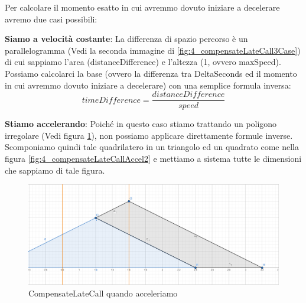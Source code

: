 \documentclass[main.tex]{subfiles}
\begin{document}
Per calcolare il momento esatto in cui avremmo dovuto iniziare a decelerare avremo due casi possibili: 
\begin{itemize}
    \item \textbf{Siamo a velocità costante}: La differenza di spazio percorso è un parallelogramma (Vedi la seconda immagine di \ref{fig:4_compensateLateCall3Case}) di cui sappiamo l'area (distanceDifference) e l'altezza (1, ovvero maxSpeed). Possiamo calcolarci la base (ovvero la differenza tra DeltaSeconds ed il momento in cui avremmo dovuto iniziare a decelerare) con una semplice formula inversa:
    \[timeDifference = \frac{distanceDifference}{speed}\]
    
    \begin{minipage}{.45\textwidth}
        \item \textbf{Stiamo accelerando}: Poiché in questo caso stiamo trattando un poligono irregolare (Vedi figura \ref{fig:4_compensateLateCallAccel1}), non possiamo applicare direttamente formule inverse. Scomponiamo quindi tale quadrilatero in un triangolo ed un quadrato come nella figura \ref{fig:4_compensateLateCallAccel2} e mettiamo a sistema tutte le dimensioni che sappiamo di tale figura.
    \end{minipage}
    \hfill%
    \begin{minipage}{.475\textwidth}
        \begin{figure}[H]
            \centering
            \includegraphics[scale=0.2]{img/interpolazione/compensateLateCallAccel1.png}
            \caption{CompensateLateCall quando acceleriamo}
            \label{fig:4_compensateLateCallAccel1}
        \end{figure}
    \end{minipage}


\end{itemize}
\end{document}
